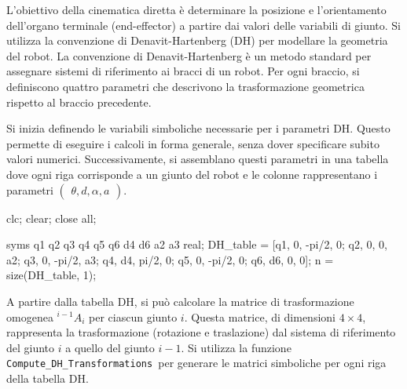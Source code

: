 \documentclass[11pt, a4paper]{article}
\begin{document}

\begin{par}
\begin{flushleft}
L'obiettivo della cinematica diretta è determinare la posizione e l'orientamento dell'organo terminale (end-effector) a partire dai valori delle variabili di giunto. Si utilizza la convenzione di Denavit-Hartenberg (DH) per modellare la geometria del robot. La convenzione di Denavit-Hartenberg è un metodo standard per assegnare sistemi di riferimento ai bracci di un robot. Per ogni braccio, si definiscono quattro parametri che descrivono la trasformazione geometrica rispetto al braccio precedente.
\end{flushleft}
\end{par}

\begin{par}
\begin{flushleft}
Si inizia definendo le variabili simboliche necessarie per i parametri DH. Questo permette di eseguire i calcoli in forma generale, senza dover specificare subito valori numerici. Successivamente, si assemblano questi parametri in una tabella dove ogni riga corrisponde a un giunto del robot e le colonne rappresentano i parametri $\left(\begin{array}{c}
\theta ,d,\alpha ,a
\end{array}\right)$.
\end{flushleft}
\end{par}

\begin{matlabcode}
clc;
clear;
close all;

syms q1 q2 q3 q4 q5 q6 d4 d6 a2 a3 real;
DH_table = [q1, 0,  -pi/2, 0;
            q2, 0,   0,    a2;
            q3, 0,  -pi/2, a3;
            q4, d4,  pi/2, 0;
            q5, 0,  -pi/2, 0;
            q6, d6,  0,    0];
n = size(DH_table, 1);
\end{matlabcode}

\begin{par}
\begin{flushleft}
A partire dalla tabella DH, si può calcolare la matrice di trasformazione omogenea $^{i-1}A_i$ per ciascun giunto $i$. Questa matrice, di dimensioni $4\times 4$, rappresenta la trasformazione (rotazione e traslazione) dal sistema di riferimento del giunto $i$ a quello del giunto $i-1$. Si utilizza la funzione \texttt{Compute\_DH\_Transformations }per generare le matrici simboliche per ogni riga della tabella DH.
\end{flushleft}
\end{par}
\end{document}
